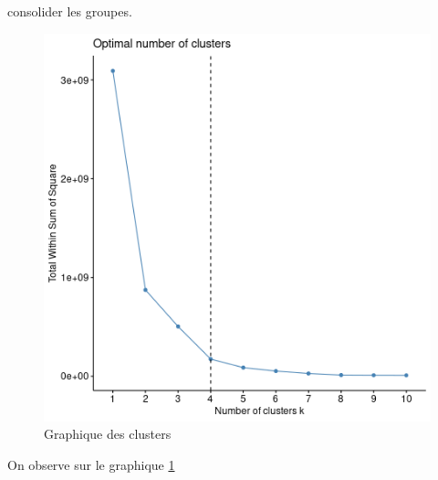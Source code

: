 \documentclass[11pt,a4paper, x11names]{article}\usepackage[]{graphicx}\usepackage[]{color}
\begin{document}
consolider les groupes.
\begin{figure}[H]
\centering
\includegraphics[scale=1]{graphiques/indiv_groups.png}
\caption{Graphique des clusters} \label{fig11:indiv_cluster}
\end{figure}
On observe sur le graphique \ref{fig11:indiv_cluster} 
\end{document}
